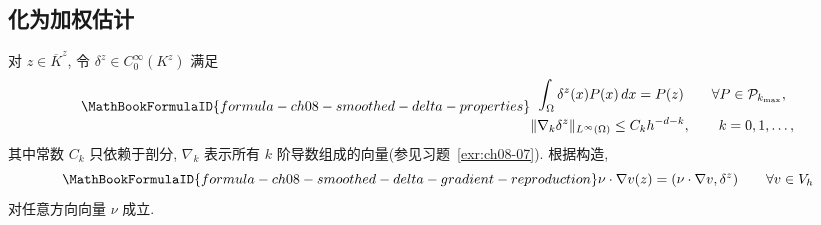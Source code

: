 \subsection{化为加权估计}
\label{sec:ch08-reduction-to-weighted-estimates}
\setcounter{thmcount}{0}
\setcounter{equation}{0}

对 $z\in\overline K^z$, 令 $\delta^z\in C_0^\infty(K^z)$ 满足
\begin{equation}
\MathBookFormulaID{formula-ch08-smoothed-delta-properties}
\label{eq:ch08-smoothed-delta-properties}
\begin{gathered}
\int_\Omega\delta^z(x)P(x)\,dx=P(z)
\qquad\forall P\in\mathcal P_{k_{\max}},\\
\|\nabla_k\delta^z\|_{L^\infty(\Omega)}\leq C_kh^{-d-k},
\qquad k=0,1,\ldots,
\end{gathered}
\end{equation}
其中常数 $C_k$ 只依赖于剖分, $\nabla_k$ 表示所有 $k$ 阶导数组成的向量(参见习题~\ref{exr:ch08-07}). 根据构造,
\begin{equation}
\MathBookFormulaID{formula-ch08-smoothed-delta-gradient-reproduction}
\label{eq:ch08-smoothed-delta-gradient-reproduction}
\nu\cdot\nabla v(z)=(\nu\cdot\nabla v,\delta^z)
\qquad\forall v\in V_h
\end{equation}
对任意方向向量 $\nu$ 成立.

